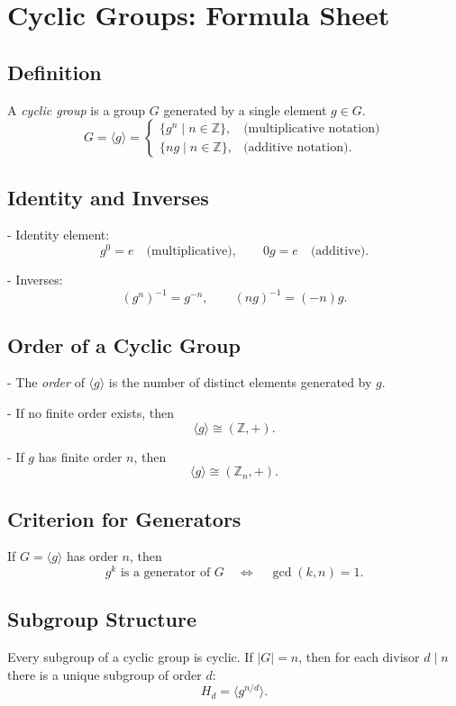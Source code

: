 \documentclass[12pt,a4paper]{article}
\begin{document}
	
	\section*{Cyclic Groups: Formula Sheet}
	
	\subsection*{Definition}
	A \emph{cyclic group} is a group $G$ generated by a single element $g \in G$.  
	\[
	G = \langle g \rangle =
	\begin{cases}
		\{ g^n \mid n \in \mathbb{Z} \}, & \text{(multiplicative notation)} \\[6pt]
		\{ n g \mid n \in \mathbb{Z} \}, & \text{(additive notation).}
	\end{cases}
	\]
	
	\subsection*{Identity and Inverses}
	- Identity element:
	\[
	g^0 = e \quad \text{(multiplicative)}, \qquad 0g = e \quad \text{(additive)}.
	\]
	
	- Inverses:
	\[
	(g^n)^{-1} = g^{-n}, \qquad (ng)^{-1} = (-n)g.
	\]
	
	\subsection*{Order of a Cyclic Group}
	- The \emph{order} of $\langle g \rangle$ is the number of distinct elements generated by $g$.  
	
	- If no finite order exists, then
	\[
	\langle g \rangle \cong (\mathbb{Z}, +).
	\]
	
	- If $g$ has finite order $n$, then
	\[
	\langle g \rangle \cong (\mathbb{Z}_n, +).
	\]
	
	\subsection*{Criterion for Generators}
	If $G = \langle g \rangle$ has order $n$, then
	\[
	g^k \text{ is a generator of } G \quad \Longleftrightarrow \quad \gcd(k,n) = 1.
	\]
	
	\subsection*{Subgroup Structure}
	Every subgroup of a cyclic group is cyclic.  
	If $|G| = n$, then for each divisor $d \mid n$ there is a unique subgroup of order $d$:
	\[
	H_d = \langle g^{n/d} \rangle.
	\]
	
\end{document}
